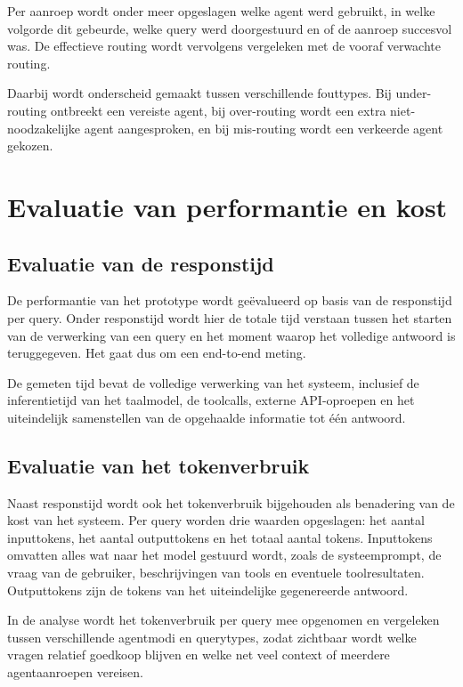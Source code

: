 Per aanroep wordt onder meer opgeslagen welke agent werd gebruikt, in welke volgorde dit gebeurde, welke query werd doorgestuurd en of de aanroep succesvol was. De effectieve routing wordt vervolgens vergeleken met de vooraf verwachte routing.

Daarbij wordt onderscheid gemaakt tussen verschillende fouttypes. Bij under-routing ontbreekt een vereiste agent, bij over-routing wordt een extra niet-noodzakelijke agent aangesproken, en bij mis-routing wordt een verkeerde agent gekozen.

\section{Evaluatie van performantie en kost}
\label{sec:evaluatie-performantie-methode}

\subsection{Evaluatie van de responstijd}
\label{subsec:responstijd-methode}

De performantie van het prototype wordt geëvalueerd op basis van de responstijd per query. Onder responstijd wordt hier de totale tijd verstaan tussen het starten van de verwerking van een query en het moment waarop het volledige antwoord is teruggegeven. Het gaat dus om een end-to-end meting.

De gemeten tijd bevat de volledige verwerking van het systeem, inclusief de inferentietijd van het taalmodel, de toolcalls, externe \gls{API}-oproepen en het uiteindelijk samenstellen van de opgehaalde informatie tot één antwoord.

\subsection{Evaluatie van het tokenverbruik}
\label{subsec:tokenverbruik-methode}

Naast responstijd wordt ook het tokenverbruik bijgehouden als benadering van de kost van het systeem. Per query worden drie waarden opgeslagen: het aantal inputtokens, het aantal outputtokens en het totaal aantal tokens. Inputtokens omvatten alles wat naar het model gestuurd wordt, zoals de systeemprompt, de vraag van de gebruiker, beschrijvingen van tools en eventuele toolresultaten. Outputtokens zijn de tokens van het uiteindelijke gegenereerde antwoord.

In de analyse wordt het tokenverbruik per query mee opgenomen en vergeleken tussen verschillende agentmodi en querytypes, zodat zichtbaar wordt welke vragen relatief goedkoop blijven en welke net veel context of meerdere agentaanroepen vereisen.

